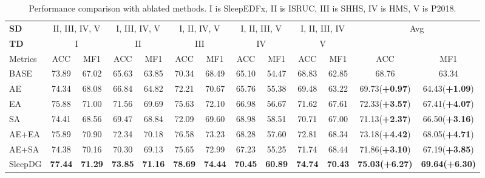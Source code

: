 \documentclass[letterpaper]{article} %
\begin{document}
	\begin{table}[tb]
		\centering
		\small
		\begin{tabular}{lcccccccccccc} 
			\toprule
			\textbf{SD}& \multicolumn{2}{c}{II, III, IV, V} & \multicolumn{2}{c}{I, III, IV, V} & \multicolumn{2}{c}{I, II, IV, V} & \multicolumn{2}{c}{I, II, III, V} & \multicolumn{2}{c}{I, II, III, IV}& \multicolumn{2}{c}{\multirow{2}{*}{Avg}}\\
			\cmidrule(lr){1-1}\cmidrule(lr){2-3}\cmidrule(lr){4-5}\cmidrule(lr){6-7}\cmidrule(lr){8-9}\cmidrule(lr){10-11}
			\textbf{TD}&\multicolumn{2}{c}{I} & \multicolumn{2}{c}{II} & \multicolumn{2}{c}{III} & \multicolumn{2}{c}{IV} & \multicolumn{2}{c}{V}&&\\
			\cmidrule(lr){1-1}\cmidrule(lr){2-3}\cmidrule(lr){4-5}\cmidrule(lr){6-7}\cmidrule(lr){8-9}\cmidrule(lr){10-11}\cmidrule(lr){12-13}
			Metrics& ACC & MF1 & ACC & MF1 & ACC & MF1 & ACC & MF1 & ACC & MF1 & ACC & MF1 \\
			\midrule
			BASE&73.89&67.02&65.63&63.85&70.34&68.49&65.10&54.47&68.83&62.85&68.76&63.34\\
			AE&74.34&68.08&66.84&64.82&72.21&70.67&65.76&55.38&69.48&63.22&69.73(\textbf{+0.97})&64.43(\textbf{+1.09})\\
			EA&75.88&71.00&71.56&69.69&75.63&72.10&66.98&56.67&71.62&67.61&72.33(\textbf{+3.57})&67.41(\textbf{+4.07})\\
			SA&74.41&68.56&69.47&68.84&72.09&69.60&68.98&58.51&70.71&67.00&71.13(\textbf{+2.37})&66.50(\textbf{+3.16})\\
			AE+EA&75.89&70.90&72.34&70.18&76.58&73.23&68.28&57.60&72.81&68.34&73.18(\textbf{+4.42})&68.05(\textbf{+4.71})\\
			AE+SA&74.38&70.16&70.30&69.13&75.65&72.99&67.23&55.25&71.74&68.44&71.86(\textbf{+3.10})&67.19(\textbf{+3.85})\\
			\midrule
			SleepDG&\textbf{77.44}&\textbf{71.29}&\textbf{73.85}&\textbf{71.16}&\textbf{78.69}&\textbf{74.44}&\textbf{70.45}&\textbf{60.89}&\textbf{74.74}&\textbf{70.43}&\textbf{75.03(+6.27)}&\textbf{69.64(+6.30)}\\
			\bottomrule
		\end{tabular}
		\caption{Performance comparison with ablated methods. I is SleepEDFx, II is ISRUC, III is SHHS, IV is HMS, V is P2018.}\label{tab:AblationStudy}
	\end{table}
	
\end{document}
